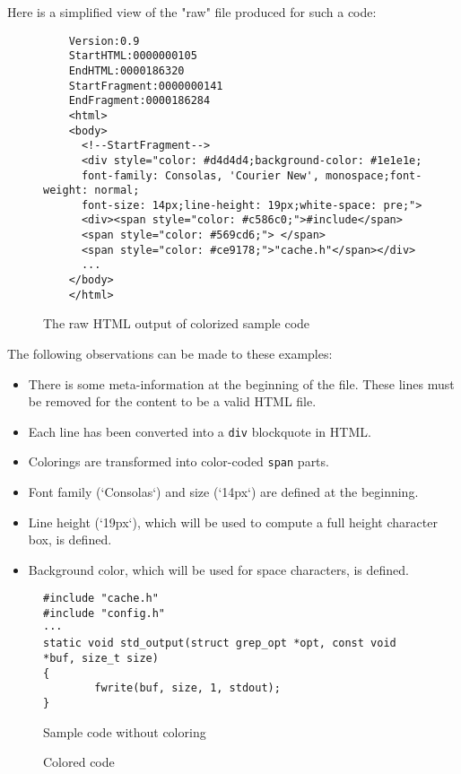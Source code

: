 \documentclass{article}
\begin{document}
Here is a simplified view of the "raw" file produced for such a code:

\begin{figure}[H]
  \centering
  \begin{BVerbatim}
    Version:0.9
    StartHTML:0000000105
    EndHTML:0000186320
    StartFragment:0000000141
    EndFragment:0000186284
    <html>
    <body>
      <!--StartFragment-->
      <div style="color: #d4d4d4;background-color: #1e1e1e;
      font-family: Consolas, 'Courier New', monospace;font-weight: normal;
      font-size: 14px;line-height: 19px;white-space: pre;">
      <div><span style="color: #c586c0;">#include</span>
      <span style="color: #569cd6;"> </span>
      <span style="color: #ce9178;">"cache.h"</span></div>
      ...
    </body>
    </html>
  \end{BVerbatim}
  \caption{The raw HTML output of colorized sample code}
  \label{code:syntaxhtml}
\end{figure}

The following observations can be made to these examples:

\begin{itemize}
\item There is some meta-information at the beginning of the file. These lines must be removed for the content to be a valid HTML file.
\item Each line has been converted into a \texttt{div} blockquote in HTML.
\item Colorings are transformed into color-coded \texttt{span} parts.
\item Font family (`Consolas`) and size (`14px`) are defined at the beginning.
\item Line height (`19px`), which will be used to compute a full height character box, is defined.
\item Background color, which will be used for space characters, is defined.
\end{itemize}

\begin{figure}[htb]
  \centering
  \begin{BVerbatim}
#include "cache.h"
#include "config.h"
···
static void std_output(struct grep_opt *opt, const void *buf, size_t size)
{
        fwrite(buf, size, 1, stdout);
}
  \end{BVerbatim}
  \caption{Sample code without coloring}
  \label{fig:plain_code}
\end{figure}

\begin{figure}[h]
  \centering
  
  \caption{Colored code}
  \label{fig:colored_code}
\end{figure}
\end{document}
